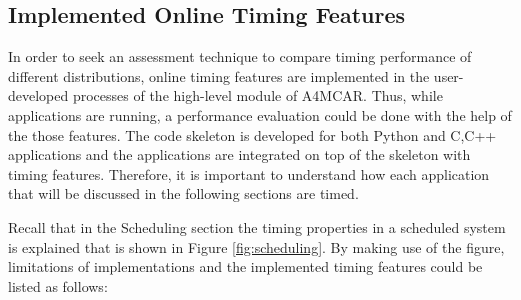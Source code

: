 \subsection{Implemented Online Timing Features}
In order to seek an assessment technique to compare timing performance of different distributions, online timing features are implemented in the user-developed processes of the high-level module of A4MCAR. Thus, while applications are running, a performance evaluation could be done with the help of the those features. The code skeleton is developed for both Python and C,C++ applications and the applications are integrated on top of the skeleton with timing features. Therefore, it is important to understand how each application that will be discussed in the following sections are timed.

Recall that in the Scheduling section the timing properties in a scheduled system is explained that is shown in Figure \ref{fig:scheduling}. By making use of the figure, limitations of implementations and the implemented timing features could be listed as follows:
